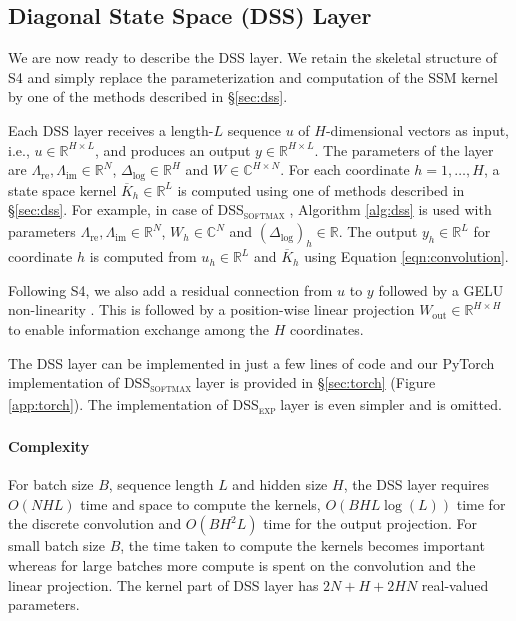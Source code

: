 \subsection{Diagonal State Space (DSS) Layer}\label{sec:dss-layer}

We are now ready to describe the DSS layer. We retain the skeletal structure of S4 and simply replace the parameterization and computation of the SSM kernel by one of the methods described in \S\ref{sec:dss}.

Each DSS layer receives a length-$L$ sequence $u$ of $H$-dimensional vectors as input, i.e., $u \in \mathbb{R}^{H\times L}$, and produces an output $y \in \mathbb{R}^{H\times L}$. The parameters of the layer are $\Lambda_\mathrm{re}, \Lambda_\mathrm{im} \in \mathbb{R}^N$, $\Delta_{\log} \in \mathbb{R}^{H}$ and $W \in \mathbb{C}^{H \times N}$. For each coordinate $h=1,\ldots,H$, a state space kernel $\overline{K}_h \in \mathbb{R}^L$ is computed using one of methods described in \S\ref{sec:dss}. For example, in case of \textsc{DSS}\textsubscript{\textsc{softmax}} , Algorithm \ref{alg:dss} is used with parameters $\Lambda_\mathrm{re}, \Lambda_\mathrm{im} \in \mathbb{R}^{N}$, $W_h \in \mathbb{C}^{N}$ and $(\Delta_{\log})_h \in \mathbb{R}$. The output $y_h \in \mathbb{R}^L$ for coordinate $h$ is computed from $u_h \in \mathbb{R}^L$ and $\overline{K}_h$ using Equation \ref{eqn:convolution}.

Following S4, we also add a residual connection from $u$ to $y$ followed by a GELU non-linearity \cite{hendrycks2016gelu}. This is followed by a position-wise linear projection $W_{\text{out}} \in \mathbb{R}^{H\times H}$ to enable information exchange among the $H$ coordinates.

The DSS layer can be implemented in just a few lines of code and our PyTorch implementation of \textsc{DSS}\textsubscript{\textsc{softmax}}  layer is provided in \S\ref{sec:torch} (Figure \ref{app:torch}). The implementation of \textsc{DSS}\textsubscript{\textsc{exp}}  layer is even simpler and is omitted.

\paragraph{Complexity} For batch size $B$, sequence length $L$ and hidden size $H$, the DSS layer requires $O(NHL)$ time and space to compute the kernels, $O(BHL\log(L))$ time for the discrete convolution and $O(BH^2L)$ time for the output projection. For small batch size $B$, the time taken to compute the kernels becomes important whereas for large batches more compute is spent on the convolution and the linear projection. The kernel part of DSS layer has $2N + H + 2HN$ real-valued parameters.

